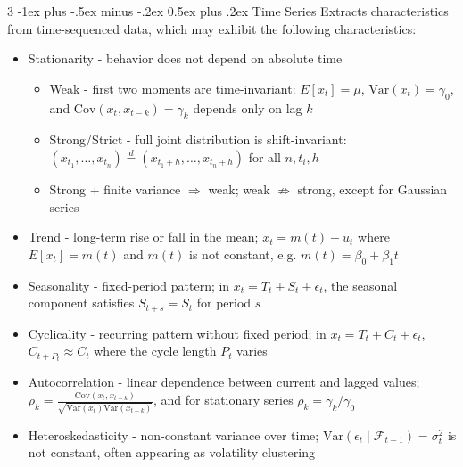 \documentclass[10pt,landscape]{article}
\makeatletter
\renewcommand{\section}{\@startsection{section}{1}{0mm}%
                                {-1ex plus -.5ex minus -.2ex}%
                                {0.5ex plus .2ex}%
                                {\normalfont\large\bfseries}}
\makeatother
\begin{document}
\begin{multicols}{3}
        \section{Time Series}
        Extracts characteristics from time-sequenced data, which may exhibit the following characteristics:
        \begin{itemize}[label={--},leftmargin=4mm]
            \itemsep -.4mm
            \item Stationarity - behavior does not depend on absolute time
                  \vspace{-.7mm}
                  \begin{itemize}[label={$\circ$},leftmargin=3mm]
                      \itemsep -.4mm
                      \item Weak - first two moments are time-invariant: $E[x_t]=\mu$, $\mathrm{Var}(x_t)=\gamma_0$, and $\mathrm{Cov}(x_t,x_{t-k})=\gamma_k$ depends only on lag $k$
                      \item Strong/Strict - full joint distribution is shift-invariant: $(x_{t_1},\ldots,x_{t_n})\overset{d}{=}(x_{t_1+h},\ldots,x_{t_n+h})$ for all $n,t_i,h$
                      \item Strong $+$ finite variance $\Rightarrow$ weak; weak $\nRightarrow$ strong, except for Gaussian series
                  \end{itemize}
            \item Trend - long-term rise or fall in the mean; $x_t=m(t)+u_t$ where $E[x_t]=m(t)$ and $m(t)$ is not constant, e.g. $m(t)=\beta_0+\beta_1t$
            \item Seasonality - fixed-period pattern; in $x_t=T_t+S_t+\epsilon_t$, the seasonal component satisfies $S_{t+s}=S_t$ for period $s$
            \item Cyclicality - recurring pattern without fixed period; in $x_t=T_t+C_t+\epsilon_t$, $C_{t+P_t}\approx C_t$ where the cycle length $P_t$ varies
            \item Autocorrelation - linear dependence between current and lagged values; $\rho_k=\frac{\mathrm{Cov}(x_t,x_{t-k})}{\sqrt{\mathrm{Var}(x_t)\mathrm{Var}(x_{t-k})}}$, and for stationary series $\rho_k=\gamma_k/\gamma_0$
            \item Heteroskedasticity - non-constant variance over time; $\mathrm{Var}(\epsilon_t\mid\mathcal{F}_{t-1})=\sigma_t^2$ is not constant, often appearing as volatility clustering
        \end{itemize}


\end{multicols}
\end{document}
